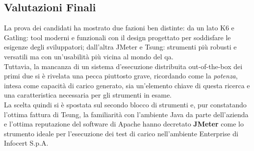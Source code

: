 \subsection{Valutazioni Finali}
La prova dei candidati ha mostrato due fazioni ben distinte: da un lato K6 e Gatling: tool moderni e funzionali con il design progettato per soddisfare le esigenze degli sviluppatori; dall'altra JMeter e Tsung: strumenti più robusti e versatili ma con un'usabilità più vicina al mondo del \gls{qa}. \\
Tuttavia, la mancanza di un sistema d'esecuzione distribuita \gls{out-of-the-box} dei primi due si è rivelata una pecca piuttosto grave, ricordando come la \textit{potenza}, intesa come capacità di carico generato, sia un'elemento chiave di questa ricerca e una caratteristica necessaria per gli strumenti in esame. \\
La scelta quindi si è spostata sul secondo blocco di strumenti e, pur constatando l'ottima fattura di Tsung, la familiarità con l'ambiente Java da parte dell'azienda e l'ottima reputazione del software di Apache hanno decretato \textbf{JMeter} come lo strumento ideale per l'esecuzione dei test di carico nell'ambiente Enterprise di Infocert S.p.A.